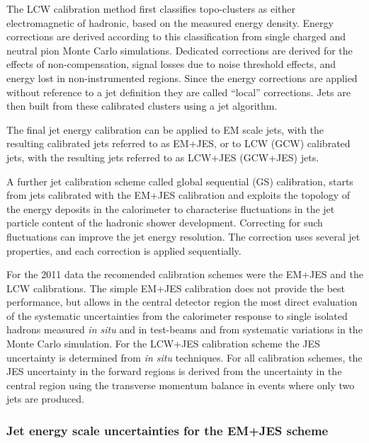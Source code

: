 The LCW calibration method first classifies topo-clusters as either electromagnetic of hadronic, based on the measured energy density. Energy corrections are derived according to this classification from single charged and neutral pion Monte Carlo simulations. Dedicated corrections are derived for the effects of non-compensation, signal losses due to noise threshold effects, and energy lost in non-instrumented regions. Since the energy corrections are applied without reference to a jet definition they are called ``local'' corrections. Jets are then built from these calibrated clusters using a jet algorithm.  

The final jet energy calibration can be applied to EM scale jets, with the resulting calibrated jets referred to as EM+JES, or to LCW (GCW) calibrated jets, with the resulting jets referred to as LCW+JES (GCW+JES) jets.

A further jet calibration scheme called global sequential (GS) calibration, starts from jets calibrated with the EM+JES calibration and exploits the topology of the energy deposits in the calorimeter to characterise fluctuations in the jet particle content of the hadronic shower development.  Correcting for such fluctuations can improve the jet energy resolution. The correction uses several jet properties, and each correction is applied sequentially.


For the 2011 data the recomended calibration schemes were the EM+JES and the LCW calibrations. The simple EM+JES calibration does not provide the best performance, but allows in the central detector region the most direct evaluation of the systematic uncertainties from the calorimeter response to single isolated hadrons measured \emph{in situ}  and in test-beams and from systematic variations in the Monte Carlo simulation.  For the LCW+JES calibration scheme the JES uncertainty is determined from \emph{in situ}  techniques. For all calibration schemes, the JES uncertainty in the forward regions is derived from the uncertainty in the central region using the transverse momentum balance in events where only two jets are produced. 



\subsubsection{Jet energy scale uncertainties for the EM+JES scheme}

